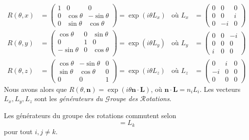 \documentclass[../notesdecours.tex]{subfiles}
\begin{document}
\begin{align*}
    R(\theta,x) &= \begin{pmatrix}
    1 & 0 & 0\\
    0 & \cos\theta & -\sin\theta\\
    0 & \sin\theta & \cos\theta
    \end{pmatrix} = \exp (i\theta L_x)			&\text{où } L_x &= \begin{pmatrix}
    0 & 0 & 0\\
    0 & 0 & i\\
    0 & -i & 0
    \end{pmatrix}\\
    R(\theta,y) &= \begin{pmatrix}
    \cos\theta & 0 & \sin\theta\\
    0 & 1 & 0\\
    -\sin\theta & 0 & \cos\theta\\
    \end{pmatrix} = \exp(i\theta L_y)		&\text{où } L_y &= \begin{pmatrix}
    0 & 0 & -i\\
    0 & 0 & 0\\
    i & 0 & 0
    \end{pmatrix}\\
    R(\theta,z) &= \begin{pmatrix}
    \cos\theta & -\sin\theta & 0\\
    \sin\theta & \cos\theta & 0\\
    0 & 0 & 1
    \end{pmatrix} = \exp(i\theta L_z)		&\text{où } L_z &= \begin{pmatrix}
    0 & i & 0\\
    -i & 0 & 0\\
    0 & 0 & 0
    \end{pmatrix}
\end{align*}
Nous avons alors que $R(\theta,\bm{n}) = \exp (i\theta\bm{n}\cdot\bm{L})$, où $\bm{n}\cdot\bm{L} = n_iL_i$. Les vecteurs $L_x,L_y,L_z$ sont les \emph{générateurs du $\mathcal{G}$roupe des $\mathcal{R}$otations}.

\begin{Property}
    Les générateurs du groupe des rotations commutent selon
    \begin{equation}
        [L_i,L_j] = L_k
    \end{equation}
    pour tout $i,j \neq k$. 
\end{Property}
\end{document}
